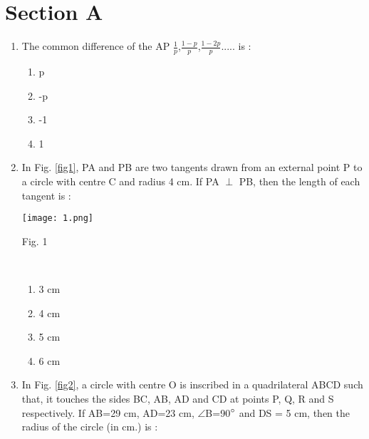 \documentclass[journal,12pt,twocolumn]{IEEEtran}
\renewcommand\thesection{\arabic{section}}
\begin{document}
\section{Section A}
\renewcommand{\theequation}{\theenumi}
\begin{enumerate}[label=\thesection.\arabic*.,ref=\thesection.\theenumi]
\item The common difference of the AP $\frac{1}{p}$,$\frac{1-p}{p}$,$\frac{1-2p}{p}$..... is :
 \begin{enumerate}[A]
    \item p\\
    \item -p\\
    \item -1\\
    \item 1 \\
 \end{enumerate}
\item In Fig. \ref{fig1}, PA and PB are two tangents drawn from an external point P to a
circle with centre C and radius 4 cm. If PA $\perp$ PB, then the length of each
tangent is :

    \texttt{[image: 1.png]}\\{\centering

\caption{Fig. 1}\\}
    \label{fig1}
 \begin{enumerate}[A]
    \item 3 cm\\
    \item 4 cm\\
    \item 5 cm\\
    \item 6 cm
 \end{enumerate}
\item In Fig. \ref{fig2}, a circle with centre O is inscribed in a quadrilateral ABCD such
that, it touches the sides BC, AB, AD and CD at points P, Q, R and S respectively. If AB=29 cm, AD=23 cm, $\angle$B=90$\degree$ and DS = 5 cm, then the radius of the circle (in cm.) is : \\


\end{enumerate}
\end{document}
